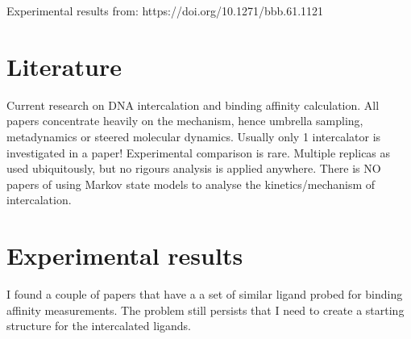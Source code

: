 \documentclass{article}
\begin{document}
Experimental results from: https://doi.org/10.1271/bbb.61.1121

\section{Literature}

Current research on DNA intercalation and binding affinity calculation. All papers concentrate heavily on the mechanism, hence umbrella sampling, metadynamics or steered molecular dynamics. Usually only 1 intercalator is investigated in a paper! Experimental comparison is rare. Multiple replicas as used ubiquitously, but no rigours analysis is applied anywhere. There is NO papers of using Markov state models to analyse the kinetics/mechanism of intercalation. 

\section{Experimental results}

I found a couple of papers that have a a set of similar ligand probed for binding affinity measurements. The problem still persists that I need to create a starting structure for the intercalated ligands. 
\end{document}
